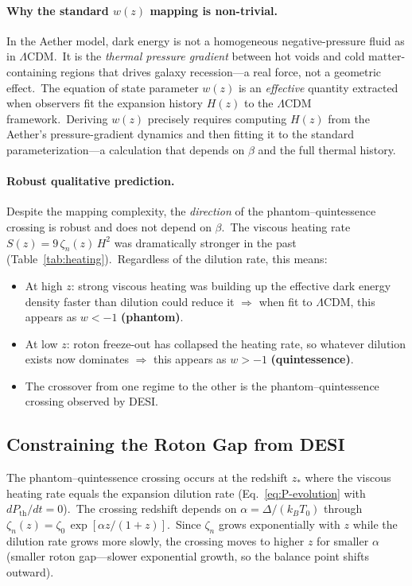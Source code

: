 \documentclass[12pt,letterpaper]{article}
\begin{document}
\paragraph{Why the standard $w(z)$ mapping is non-trivial.}
In the Aether model, dark energy is not a homogeneous negative-pressure fluid
as in $\Lambda$CDM.\ It is the \emph{thermal pressure gradient} between hot
voids and cold matter-containing regions that drives galaxy recession---a real
force, not a geometric effect.\ The equation of state parameter $w(z)$ is an
\emph{effective} quantity extracted when observers fit the expansion history
$H(z)$ to the $\Lambda$CDM framework.\ Deriving $w(z)$ precisely requires
computing $H(z)$ from the Aether's pressure-gradient dynamics and then
fitting it to the standard parameterization---a calculation that depends on
$\beta$ and the full thermal history.

\paragraph{Robust qualitative prediction.}
Despite the mapping complexity, the \emph{direction} of the phantom--quintessence
crossing is robust and does not depend on $\beta$.\ The viscous heating rate
$S(z) = 9\,\zeta_n(z)\,H^2$ was dramatically stronger in the past
(Table~\ref{tab:heating}).\ Regardless of the dilution rate, this means:

\begin{itemize}[leftmargin=2em]
  \item At high $z$: strong viscous heating was building up the effective dark
    energy density faster than dilution could reduce it $\Rightarrow$ when fit to
    $\Lambda$CDM, this appears as $w < -1$ \textbf{(phantom)}.
  \item At low $z$: roton freeze-out has collapsed the heating rate, so whatever
    dilution exists now dominates $\Rightarrow$ this appears as $w > -1$
    \textbf{(quintessence)}.
  \item The crossover from one regime to the other is the phantom--quintessence
    crossing observed by DESI.
\end{itemize}


\subsection{Constraining the Roton Gap from DESI}

The phantom--quintessence crossing occurs at the redshift $z_*$ where the
viscous heating rate equals the expansion dilution rate
(Eq.~\ref{eq:P-evolution} with $dP_{\mathrm{th}}/dt = 0$).\ The crossing
redshift depends on $\alpha = \Delta/(k_B T_0)$ through
$\zeta_n(z) = \zeta_0\,\exp[\alpha z/(1+z)]$.\ Since $\zeta_n$ grows
exponentially with $z$ while the dilution rate grows more slowly, the
crossing moves to higher $z$ for smaller $\alpha$ (smaller roton gap---slower
exponential growth, so the balance point shifts outward).
\end{document}
